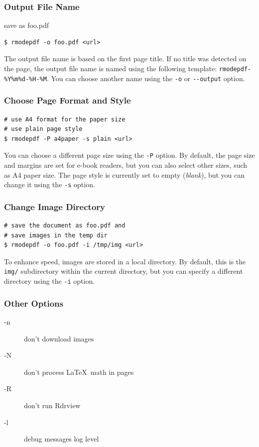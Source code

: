 \begin{frame}[fragile]
  \frametitle{Output File Name}
  \begin{block}{save as foo.pdf}
  \begin{verbatim}
$ rmodepdf -o foo.pdf <url>
  \end{verbatim}
\end{block}
\end{frame}

The output file name is based on the first page title. If no title was detected on the page, the output file name 
is named using the following template: \verb|rmodepdf-%Y%m%d-%H-%M|. You can choose another name using 
the \verb|-o| or \verb|--output| option.

\begin{frame}[fragile]
  \frametitle{Choose Page Format and Style}
  \begin{block}{}
\begin{verbatim}
# use A4 format for the paper size 
# use plain page style
$ rmodepdf -P a4paper -s plain <url>
\end{verbatim}
\end{block}
\end{frame}


You can choose a different page size using the \texttt{-P} option. By default,
the page size and margins are set for e-book readers, but you can also select
other sizes, such as A4 paper size. The page style is currently set to empty
(\textit{blank}), but you can change it using the \texttt{-s} option.

\begin{frame}[fragile]
  \frametitle{Change Image Directory}
\begin{verbatim}
# save the document as foo.pdf and 
# save images in the temp dir
$ rmodepdf -o foo.pdf -i /tmp/img <url>
\end{verbatim}

\end{frame}


To enhance speed, images are stored in a local directory. By default, this is
the \texttt{img/} subdirectory within the current directory, but you can
specify a different directory using the \texttt{-i} option. 

\begin{frame}[fragile]
  \frametitle{Other Options}
  \begin{description}
    \item[-n] don't download images
    \item[-N] don't process \LaTeX\ math in pages
    \item[-R] don't run Rdrview
    \item[-l] debug messages log level
  \end{description}
\end{frame}


